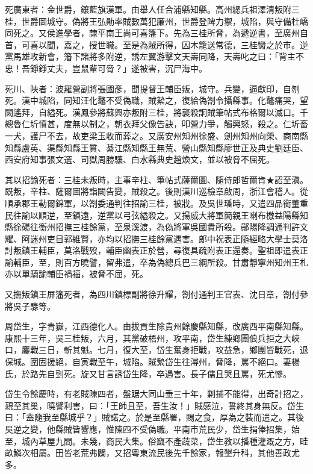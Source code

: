 \begin{pinyinscope}
死廣東者：金世爵，鑲藍旗漢軍。由舉人任合浦縣知縣。高州總兵祖澤清叛附三桂，世爵圖城守。偽將王弘勛率賊數萬犯廉州，世爵登陴力禦，城陷，與守備杜嶠同死之。又侯進學者，隸平南王尚可喜籓下。先為三桂所脅，為遞逆書，至廣州自首，可喜以聞，嘉之，授世職。至是為賊所得，囚木籠送常德，三桂臠之於市。逆黨馬雄攻新會，籓下諸將多附逆，誘左翼游擊文天壽同降，天壽叱之曰：「背主不忠！吾錚錚丈夫，豈鼠輩可脅？」遂被害，沉尸海中。

死川、陜者：波羅營副將張國彥，聞提督王輔臣叛，城守。兵變，逼獻印，自刎死。漢中城陷，同知汪化鼇不受偽職，賊縶之，復給偽劄令攝縣事。化鼇痛哭，望闕遙拜，自縊死。漢鳳參將蘇興亦叛附三桂，將襲殺詗賊筆帖式布格爾以滅口。千總魯仁圻憤甚，度無以制之，朝衣拜父像告訣，叩營力爭，觸興怒，殺之。仁圻畜一犬，護尸不去，故吏梁玉收而葬之。又廣安州知州徐盛、劍州知州向榮、商南縣知縣盧英、渠縣知縣王質、綦江縣知縣王無荒、營山縣知縣廖世正及典史劉廷臣、西安府知事張文選、司獄周勝驤、白水縣典史趙煥文，並以被脅不屈死。

其以招諭死者：三桂未叛時，主事辛柱、筆帖式薩爾圖、隨侍郎哲爾肯★詔至滇。既叛，辛柱、薩爾圖將詣闕告變，賊殺之。後則漢川巡檢章啟周，浙江會稽人。從順承郡王勒爾錦軍，以劄委通判往招諭三桂，被戕。及吳世璠時，又遣四品銜董重民往諭以順逆，至鎮遠，逆黨以弓弦縊殺之。又揚威大將軍簡親王喇布檄益陽縣知縣徐碭往衡州招撫三桂餘黨，至泉溪渡，為偽將軍吳國貴所殺。鄖陽降調通判許文耀、阿迷州吏目郭維賢，亦均以招撫三桂餘黨遇害。郎中祝表正隨經略大學士莫洛討叛鎮王輔臣，莫洛戰歿，輔臣幽表正於營，尋復具疏附表正還奏。聖祖即遣表正諭輔臣，至，則百方曉譬，留弗遣，卒為偽總兵巴三綱所殺。甘肅靜寧州知州王札亦以單騎諭輔臣禍福，被脅不屈，死。

又撫叛鎮王屏籓死者，為四川鎮標副將徐升耀，劄付通判王官表、沈日章，劄付參將吳子騄等。

周岱生，字青嶽，江西德化人。由拔貢生除貴州餘慶縣知縣，改廣西平南縣知縣。康熙十三年，吳三桂叛，六月，其黨破梧州，攻平南，岱生練鄉團俍兵拒之大峽口，鏖戰三日，斬其魁。七月，復大至，岱生奮身拒戰，攻益急，鄉團皆戰死，退保城。圍固援絕，自寅戰至午，城陷。賊縶岱生往潯州，脅降，罵不絕口。妻楊氏，於路先自剄死。旋又甘言誘岱生降，卒遇害。長子儒且哭且罵，死尤慘。

岱生令餘慶時，有老賊陳四者，盤踞大同山垂三十年，剿捕不能得，出奇計招之，親至其巢，曉譬利害，曰：「王師且至，吾生汝！」賊感泣，誓終其身無反。岱生曰：「盍隨我至縣城乎？」賊諾之。於是至縣署，賜之食，厚為之裝而遣之。其後吳逆之變，他縣賊皆響應，惟陳四不受偽職。平南市荒民少，岱生捐俸招集，始至，城內草屋九間。未幾，商民大集。俗窳不產蔬菜，岱生教以播種灌溉之方，畦畝鱗次相屬。田皆老荒弗闢，又招粵東流民後先千餘家，報墾升科，其他善政尤多。


\end{pinyinscope}

